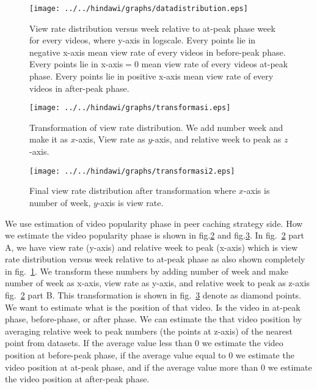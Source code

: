 \begin{figure}[!t]
\begin{center}
\texttt{[image: ../../hindawi/graphs/datadistribution.eps]}
\end{center}
\caption{View rate distribution versus week relative to at-peak phase week for every videos, where y-axis in logscale.
Every points lie in negative x-axis mean view rate of every videos in before-peak phase.
Every points lie in x-axis$=0$ mean view rate of every videos at-peak phase. 
Every points lie in positive x-axis mean view rate of every videos in after-peak phase. }
\label{fig:viewratedistribution}
\end{figure} 


\begin{figure}[!t]
\begin{center}
\texttt{[image: ../../hindawi/graphs/transformasi.eps]}
\end{center}
\caption{Transformation of view rate distribution. We add number week and make it as $x$-axis, View rate as $y$-axis, and relative week to peak as $z$-axis.}
\label{fig:viewratedistexample}
\end{figure} 

\begin{figure}[!t]
\begin{center}
\texttt{[image: ../../hindawi/graphs/transformasi2.eps]}
\end{center}
\caption{Final view rate distribution after transformation where $x$-axis is number of week, $y$-axis is view rate.}
\label{fig:viewratedistexamplered}
\end{figure} 

We use estimation of video popularity phase in peer caching strategy side.
How we estimate the video popularity phase is shown in fig.\ref{fig:viewratedistexample} and fig.\ref{fig:viewratedistexamplered}.
In fig.~\ref{fig:viewratedistexample} part A, we have view rate (y-axis) and relative week to peak (x-axis) which is view rate distribution versus week relative to at-peak phase as also shown completely in fig.~\ref{fig:viewratedistribution}.
We transform these numbers by adding number of week and make number of week as x-axis, view rate 
as y-axis, and relative week to peak as z-axis fig.~\ref{fig:viewratedistexample} part B.
This transformation is shown in fig.~\ref{fig:viewratedistexamplered} denote as diamond points.
We want to estimate what is the position of that video. 
Is the video in at-peak phase, before-phase, or after phase.  
We can estimate the that video position by averaging relative week to peak numbers (the points at z-axis) of the nearest point from datasets. 
If the average value less than $0$ we estimate the video position at before-peak phase, if the average value equal to $0$ we estimate the video position at at-peak phase,  and if the average value more than $0$ we estimate the video position at after-peak phase.

